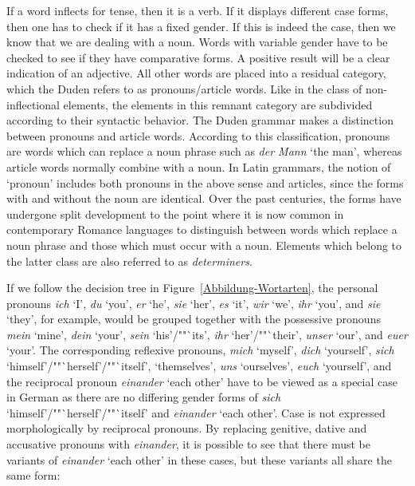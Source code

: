 If a word inflects for tense, then it is a verb. If it displays different case
forms, then one has to check if it has a fixed gender. If this is indeed the
case, then we know that we are dealing with a noun. Words with variable gender have to be
checked to see if they have comparative forms. A positive result will be a clear
indication of an adjective.  All other words are placed into a residual category,
which the Duden refers to as pronouns/article words.  Like in the class of non-inflectional
elements, the elements in this remnant category are subdivided according to their syntactic
behavior.  The Duden grammar makes a distinction between pronouns and article words. According to
this classification, pronouns are words which can replace a noun phrase such as \emph{der Mann} `the
man', whereas article words normally combine with a noun. In Latin grammars, the notion of `pronoun'
includes both pronouns in the above sense and articles, since the forms with and without the noun
are identical. Over the past centuries, the forms have undergone split development to the point
where it is now common in contemporary Romance languages to distinguish between words which replace
a noun phrase and those which must occur with a noun. Elements which belong to the latter class are
also referred to as \emph{determiners}.


If we follow the decision tree in Figure~\ref{Abbildung-Wortarten}, the personal
pronouns \emph{ich} `I', \emph{du} `you', \emph{er} `he', \emph{sie} `her', \emph{es} `it',
\emph{wir} `we', \emph{ihr} `you', and \emph{sie} `they', for example, would be grouped together
with the possessive pronouns \emph{mein} `mine', \emph{dein} `your', \emph{sein} `his'/""`its',
\emph{ihr} `her'/""`their', \emph{unser} `our', and \emph{euer} `your'. The corresponding reflexive pronouns,
\emph{mich} `myself', \emph{dich} `yourself', \emph{sich} `himself'/""`herself'/""`itself',
`themselves', \emph{uns} `ourselves', \emph{euch} `yourself', and the reciprocal pronoun
\emph{einander} `each other' have to be viewed as a special case in German as there are no differing
gender forms of \emph{sich} `himself'/""`herself'/""`itself' and \emph{einander} `each other'. Case is
not expressed morphologically by reciprocal pronouns. By replacing genitive, dative and accusative
pronouns with \emph{einander}, it is possible to see that there must be variants of \emph{einander}
`each other' in these cases, but these variants all share the same form:


